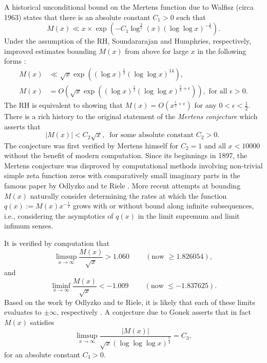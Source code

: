 \documentclass[11pt,reqno,a4letter]{article}
\numberwithin{figure}{section}
\numberwithin{table}{section}
\newcommand{\cf}{\textit{cf.\ }}
\newcommand{\seqnum}[1]{\href{http://oeis.org/#1}{\color{ProcessBlue}{\underline{#1}}}}
\theoremstyle{plain}
\numberwithin{theorem}{section}
\theoremstyle{definition}
\begin{document}
A historical unconditional bound on the Mertens function due to Walfisz (circa 1963) 
states that there is an absolute constant $C_1 > 0$ such that 
$$M(x) \ll x \times \exp\left(-C_1 \log^{\frac{3}{5}}(x) 
  (\log\log x)^{-\frac{1}{5}}\right).$$ 
Under the assumption of the RH, Soundararajan and Humphries, respectively, 
improved estimates bounding $M(x)$ from above for large $x$ in the 
following forms 
\cite{SOUND-MERTENS-ANNALS,HUMPHRIES-JNT-2013}: 
\begin{align*} 
M(x) & \ll \sqrt{x} \exp\left((\log x)^{\frac{1}{2}} (\log\log x)^{14}\right), \\ 
M(x) & = O\left(\sqrt{x} \exp\left( 
     (\log x)^{\frac{1}{2}} (\log\log x)^{\frac{5}{2}+\epsilon}\right)\right), 
     \text{ for all } \epsilon > 0. 
\end{align*} 
The RH is equivalent to showing that 
$M(x) = O\left(x^{\frac{1}{2}+\epsilon}\right)$ for any 
$0 < \epsilon < \frac{1}{2}$. 
There is a rich history to the original statement of the \emph{Mertens conjecture} which 
asserts that 
\[ 
|M(x)| < C_2 \sqrt{x},\ \text{ for some absolute constant $C_2 > 0$. }
\] 
The conjecture was first verified by Mertens himself for $C_2 = 1$ and all $x < 10000$ 
without the benefit of modern computation. 
Since its beginnings in 1897, the Mertens conjecture was disproved by computational methods involving 
non-trivial simple zeta function zeros with comparatively small imaginary parts in the famous paper by 
Odlyzko and te Riele \cite{ODLYZ-TRIELE}. 
More recent attempts 
at bounding $M(x)$ naturally consider determining the rates at which the function 
$q(x) := M(x) x^{-\frac{1}{2}}$ grows with or without bound along infinite 
subsequences, i.e., considering the asymptotics of $q(x)$ 
in the limit supremum and limit infimum senses. 

It is verified by computation 
that \cite[\cf \S 4.1]{PRIMEREC} 
\cite[\cf \seqnum{A051400}; \seqnum{A051401}]{OEIS} 
\[
\limsup_{x\rightarrow\infty} \frac{M(x)}{\sqrt{x}} > 1.060\ \qquad (\text{now } \geq 1.826054), 
\] 
and 
\[ 
\liminf_{x\rightarrow\infty} \frac{M(x)}{\sqrt{x}} < -1.009\ \qquad (\text{now } \leq -1.837625). 
\] 
Based on the work by Odlyzko and te Riele, it is likely that 
each of these limits evaluates to $\pm \infty$, respectively 
\cite{ODLYZ-TRIELE,MREVISITED,ORDER-MERTENSFN,HURST-2017}. 
A conjecture due to Gonek asserts that in fact 
$M(x)$ satisfies \cite{NG-MERTENS}
$$\limsup_{x \rightarrow \infty} \frac{|M(x)|}{\sqrt{x} (\log\log\log x)^{\frac{5}{4}}} = C_3,$$ 
for an absolute constant $C_3 > 0$. 
\end{document}
